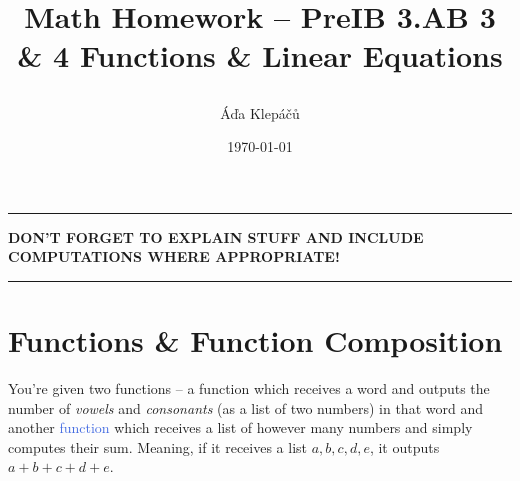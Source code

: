 \documentclass[a4paper,11pt]{article}
\title{\Huge\textsf{Math Homework -- PreIB 3.AB 3 \& 4}
 \Large\textsf{Functions \& Linear Equations}
 \author{Áďa Klepáčů}
 \date{\today}
}
\newcommand{\clr}{\textcolor{BrickRed}}
\newcommand{\clb}{\textcolor{RoyalBlue}}
\begin{document}
\maketitle
\thispagestyle{fancy}

\begin{center}
 \hrule
 \textbf{\clr{DON'T FORGET TO EXPLAIN STUFF AND INCLUDE COMPUTATIONS WHERE
 APPROPRIATE!}}
 \vspace{2ex}
 \hrule
\end{center}

\section*{Functions \& Function Composition}

You're given two functions -- a \clr{function} which receives a word and outputs
the number of \emph{vowels} and \emph{consonants} (as a list of two numbers) in
that word and another \clb{function} which receives a list of however many
numbers and simply computes their sum. Meaning, if it receives a list
$a,b,c,d,e$, it outputs $a + b + c + d + e$.
\begin{center}
\end{center}
\end{document}
